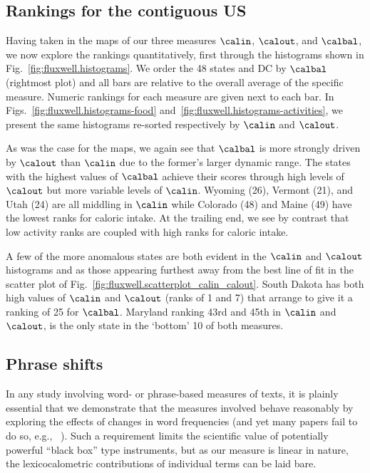 \subsection*{Rankings for the contiguous US}
\label{subsec:fluxwell.rankings}



Having taken in the maps of our three measures
$\calin$, $\calout$, and $\calbal$,
we now explore the rankings quantitatively, 
first through the histograms 
shown in Fig.~\ref{fig:fluxwell.histograms}.
We order the 48 states and DC by $\calbal$ (rightmost plot)
and all bars are relative to the overall average
of the specific measure.
Numeric rankings for each measure are given next to each bar.
In Figs.~\ref{fig:fluxwell.histograms-food}
and~\ref{fig:fluxwell.histograms-activities},
we present the same histograms re-sorted
respectively by $\calin$ and $\calout$.

As was the case for the maps, we again see that $\calbal$ is more strongly 
driven by $\calout$ than $\calin$ due to the former's larger
dynamic range.
The states with the highest values of $\calbal$ achieve
their scores through high levels of $\calout$ but
more variable levels of $\calin$.
Wyoming (26), Vermont (21), and Utah (24)
are all middling in $\calin$ while 
Colorado (48) and Maine (49) have the lowest ranks
for caloric intake.
At the trailing end, we see by contrast
that low activity ranks are coupled with high ranks for caloric intake.

A few of the more anomalous states are both evident
in the $\calin$ and $\calout$ histograms and 
as those appearing furthest away from the best line of fit
in the scatter plot of Fig.~\ref{fig:fluxwell.scatterplot_calin_calout}.
South Dakota has both high values of $\calin$ and $\calout$ 
(ranks of 1 and 7)
that arrange to give it a ranking of 25 for $\calbal$.
Maryland ranking 43rd and 45th in $\calin$ and $\calout$,
is the only state in the `bottom' 10 of both measures.

\subsection*{Phrase shifts}
\label{subsec:fluxwell.phraseshifts}



In any study involving word- or phrase-based measures of texts,
it is plainly essential that we demonstrate that the measures 
involved behave reasonably by exploring the
effects of changes in word frequencies 
(and yet many papers fail to do so, e.g., ~\cite{golder2011a}).
Such a requirement limits the scientific 
value of potentially powerful ``black box'' type instruments,
but as our measure is linear in nature, the 
lexicocalometric contributions
of individual terms can be laid bare.

